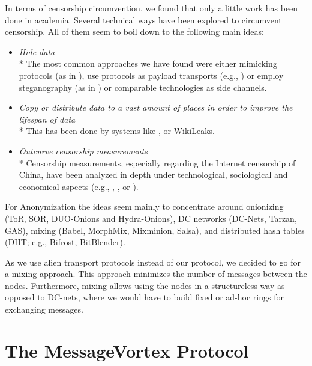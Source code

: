 \documentclass[10pt,journal,compsoc,twocolumn,twoside]{IEEEtran}
\begin{document}
In terms of censorship circumvention, we found that only a little work has been done in academia. Several technical ways have been explored to circumvent censorship. All of them seem to boil down to the following main ideas:
\begin{itemize}
	\item \emph{Hide data}\\*
	The most common approaches we have found were either mimicking protocols (as in \cite{mohajeri2013skypemorph}), use protocols as payload transports (e.g., \cite{AthanRAM07}) or employ steganography (as in \cite{f5}) or comparable technologies as side channels.
	\item \emph{Copy or distribute data to a vast amount of places in order to improve the lifespan of data}\\*
	This has been done by systems like \cite{freenet}, or WikiLeaks.
	\item \emph{Outcurve censorship measurements}\\*
	Censorship measurements, especially regarding the Internet censorship of China, have been analyzed in depth under technological, sociological and economical aspects (e.g., \cite{Ensafi_2015}, \cite{Clayton_2006}, or \cite{lowe2007great}).
\end{itemize}

For Anonymization the ideas seem mainly to concentrate around onionizing (ToR\cite{tor-spec}, SOR\cite{Egners_2012}, DUO-Onions and Hydra-Onions\cite{iwanik2005duo}), DC networks (DC-Nets\cite{chaum-dc}, Tarzan\cite{tarzan:ccs02}, GAS\cite{AthanRAM07}), mixing (Babel\cite{babel}, MorphMix\cite{morphmix:wpes2002}, Mixminion\cite{minion-design}, Salsa\cite{Salsa}), and distributed hash tables (DHT; e.g., Bifrost\cite{Kondo2009}, BitBlender\cite{Bauer_2008}).

As we use alien transport protocols instead of our protocol, we decided to go for a mixing approach. This approach minimizes the number of messages between the nodes. Furthermore, mixing allows using the nodes in a structureless way as opposed to DC-nets, where we would have to build fixed or ad-hoc rings for exchanging messages. %

\section{The MessageVortex Protocol\label{sec:protocol}}
\end{document}
